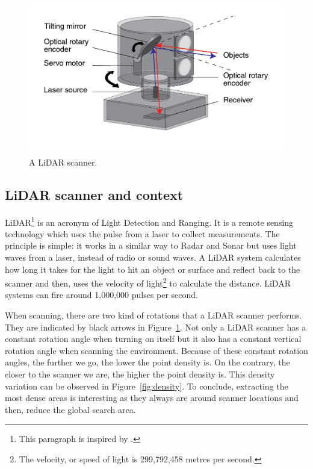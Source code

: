 \begin{figure}
  \centering
  \includegraphics[scale=1]{img/lidar.jpg}
  \caption{A LiDAR scanner.}
  \label{fig:lidar}
\end{figure}


\subsection{LiDAR scanner and context}
\label{subsc:lidar}
LiDAR\footnote{This paragraph is inspired by \cite{lidar}.} is an acronym of Light Detection and Ranging. It is a remote sensing technology which uses the pulse from a laser to collect measurements. The principle is simple: it works in a similar way to Radar and Sonar but uses light waves from a laser, instead of radio or sound waves. A LiDAR system calculates how long it takes for the light to hit an object or surface and reflect back to the scanner and then, uses the velocity of light\footnote{The velocity, or speed of light is 299,792,458 metres
per second.} to calculate the distance. LiDAR systems can fire around 1,000,000 pulses per second.

When scanning, there are two kind of rotations that a LiDAR scanner performs. They are indicated by black arrows in Figure~\ref{fig:lidar}. Not only a LiDAR scanner has a constant rotation angle when turning on itself but it also has a constant vertical rotation angle when scanning the environment. Because of these constant rotation angles, the further we go, the lower the point density is. On the contrary, the closer to the scanner we are, the higher the point density is. This density variation can be observed in
Figure~\ref{fig:density}. To conclude, extracting the most dense areas is interesting as they always are around scanner locations and then, reduce the global search area.


